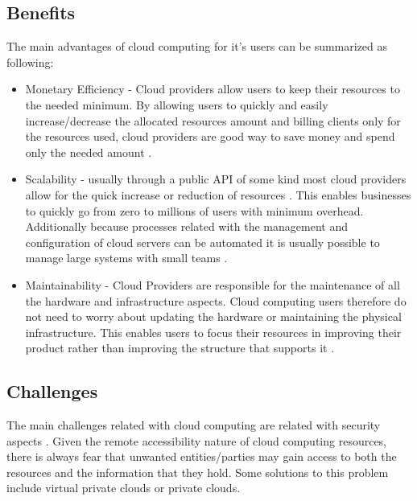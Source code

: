 		\subsection{Benefits} \label{chap:stateoftheheart:sec:cloud:sec:benefits}
			The main advantages of cloud computing for it's users can be summarized as following:
			\begin{itemize}

				\item{Monetary Efficiency} - Cloud providers allow users to keep their resources to the needed minimum. By allowing users to quickly and easily increase/decrease the allocated resources amount and billing clients only for the resources used, cloud providers are good way to save money and spend only the needed amount \cite{Garrison2012,Mell2011}.
		    
				\item{Scalability} - usually through a public API of some kind most cloud providers allow for the quick increase or reduction of resources \cite{Mell2011}. This enables businesses to quickly go from zero to millions of users with minimum overhead. Additionally because processes related with the management and configuration of cloud servers can be automated it is usually possible to manage large systems with small teams \cite{Loukides2012}. 
		    
		    	\item{Maintainability} - Cloud Providers are responsible for the maintenance of all the hardware and infrastructure aspects. Cloud computing users therefore do not need to worry about updating the hardware or maintaining the physical infrastructure. This enables users to focus their resources in improving their product rather than improving the structure that supports it \cite{Garrison2012}.
			\end{itemize}
            
		\subsection{Challenges}

		The main challenges related with cloud computing are related with security aspects \cite{Zhang2010}. Given the remote accessibility nature of cloud computing resources, there is always fear that unwanted entities/parties may gain access to both the resources and the information that they hold. Some solutions to this problem include virtual private clouds or private clouds. 



